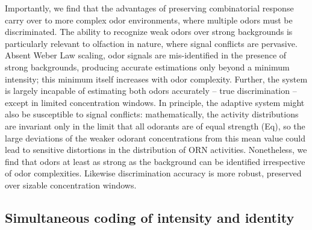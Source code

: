Importantly, we find that the advantages of preserving combinatorial response carry over to more complex odor environments, where multiple odors must be discriminated. The ability to recognize weak odors over strong backgrounds is particularly relevant to olfaction in nature, where signal conflicts are pervasive. Absent Weber Law scaling, odor signals are mis-identified in the presence of strong backgrounds, producing accurate estimations only beyond a minimum intensity; this minimum itself increases with odor complexity. Further, the system is largely incapable of estimating both odors accurately -- true discrimination -- except in limited concentration windows. In principle, the adaptive system might also be susceptible to signal conflicts: mathematically, the activity distributions are invariant only in the limit that all odorants are of equal strength (Eq), so the large deviations of the weaker odorant concentrations from this mean value could lead to sensitive distortions in the distribution of ORN activities. Nonetheless, we find that odors at least as strong as the background can be identified irrespective of odor complexities. Likewise discrimination accuracy is more robust, preserved over sizable concentration windows. 




\subsection{Simultaneous coding of intensity and identity}

